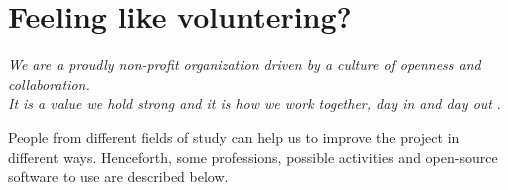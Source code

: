 
\chapter{Feeling like voluntering?}

\vspace{10mm}
 \footnotesize {
 \begin{flushright}
 \textit{
 We are a proudly non-profit organization driven by a culture of openness  and 
 collaboration. \\ It is a value we hold strong and it is how we work together, 
 day in and day out 
 }\cite{auam}.
 \end{flushright}
 }
\vspace{10mm}

 
People from different fields of study can help us to improve the project in different 
ways. Henceforth, some professions, possible activities and open-source software to use 
are described below.

